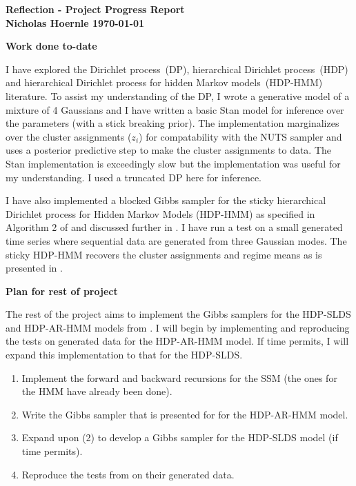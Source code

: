 \documentclass[twoside]{article}
\begin{document}
\textbf{Reflection - Project Progress Report}\\
\textbf{Nicholas Hoernle \hfill \today}

\textbf{Work done to-date}

I have explored the Dirichlet process~(DP), hierarchical Dirichlet process~(HDP) and hierarchical Dirichlet process for hidden Markov models~(HDP-HMM) literature. To assist my understanding of the DP, I wrote a generative model of a mixture of 4 Gaussians and I have written a basic Stan model for inference over the parameters (with a stick breaking prior). The implementation marginalizes over the cluster assignments ($z_i$) for compatability with the NUTS sampler and uses a posterior predictive step to make the cluster assignments to data. The Stan implementation is exceedingly slow but the implementation was useful for my understanding. I used a truncated DP here for inference.

I have also implemented a blocked Gibbs sampler for the sticky hierarchical Dirichlet process for Hidden Markov Models (HDP-HMM) as specified in Algorithm 2 of \cite{fox2007developing} and discussed further in \cite{fox2008hdp}. I have run a test on a small generated time series where sequential data are generated from three Gaussian modes. The sticky HDP-HMM recovers the cluster assignments and regime means as is presented in \cite{fox2007developing}.


\textbf{Plan for rest of project}

The rest of the project aims to implement the Gibbs samplers for the HDP-SLDS and HDP-AR-HMM models from \cite{fox2011bayesian}. I will begin by implementing and reproducing the tests on generated data for the HDP-AR-HMM model. If time permits, I will expand this implementation to that for the HDP-SLDS.
\begin{enumerate}
  \item Implement the forward and backward recursions for the SSM (the ones for the HMM have already been done).
  \item Write the Gibbs sampler that is presented for \cite{fox2011bayesian} for the HDP-AR-HMM model.
  \item Expand upon (2) to develop a Gibbs sampler for the HDP-SLDS model (if time permits).
  \item Reproduce the tests from \cite{fox2011bayesian} on their generated data.
\end{enumerate}



\end{document}
